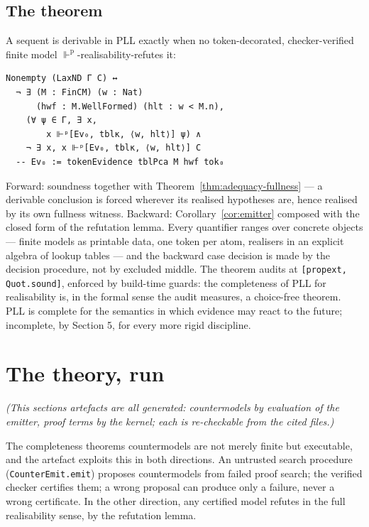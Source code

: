 \subsection{The theorem}\label{63-the-theorem}

\begin{theorem}\label{thm:crown}
A sequent is derivable in PLL exactly
when no token-decorated, checker-verified finite model
\ensuremath{\Vdash^{\mathrm{p}}}-realisability-refutes it:

\begin{lstlisting}
Nonempty (LaxND Γ C) ↔
  ¬ ∃ (M : FinCM) (w : Nat)
      (hwf : M.WellFormed) (hlt : w < M.n),
    (∀ ψ ∈ Γ, ∃ x,
        x ⊩ᵖ[Ev₀, tblκ, ⟨w, hlt⟩] ψ) ∧
    ¬ ∃ x, x ⊩ᵖ[Ev₀, tblκ, ⟨w, hlt⟩] C
  -- Ev₀ := tokenEvidence tblPca M hwf tok₀
\end{lstlisting}
\end{theorem}

Forward: soundness together with Theorem~\ref{thm:adequacy-fullness} --- a derivable conclusion
is forced wherever its realised hypotheses are, hence realised by its
own fullness witness. Backward: Corollary~\ref{cor:emitter} composed
with the closed form of the refutation lemma. Every quantifier ranges over concrete objects --- finite models
as printable data, one token per atom, realisers in an explicit algebra
of lookup tables --- and the backward case decision is made by the
decision procedure, not by excluded middle. The theorem audits at
\texttt{[propext, Quot.sound]}, enforced by build-time guards: the
completeness of PLL for realisability is, in the formal sense the audit
measures, a choice-free theorem. PLL is complete for the semantics in
which evidence may react to the future; incomplete, by Section 5, for
every more rigid discipline.

\section{The theory, run}\label{7-the-theory-run}

\emph{(This section\textquotesingle s artefacts are all generated: countermodels by
evaluation of the emitter, proof terms by the kernel; each is
re-checkable from the cited files.)}

The completeness theorem\textquotesingle s countermodels are not merely finite but
executable, and the artefact exploits this in both directions. An
untrusted search procedure (\texttt{CounterEmit.emit}) proposes countermodels
from failed proof search; the verified checker certifies them; a wrong
proposal can produce only a failure, never a wrong certificate. In the
other direction, any certified model refutes in the full realisability
sense, by the refutation lemma.

